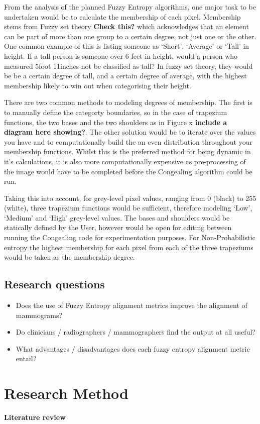 From the analysis of the planned Fuzzy Entropy algorithms, one major task to be undertaken would be to calculate the membership of each pixel. Membership stems from Fuzzy set theory \textbf{Check this?} which acknowledges that an element can be part of more than one group to a certain degree, not just one or the other. One common example of this is listing someone as `Short', `Average' or `Tall' in height. If a tall person is someone over 6 feet in height, would a person who measured 5foot 11inches not be classified as tall? In fuzzy set theory, they would be be a certain degree of tall, and a certain degree of average, with the highest membership likely to win out when categorising their height.

There are two common methods to modeling degrees of membership. The first is to manually define the categorty boundaries, so in the case of trapezium functions, the two bases and the two shoulders as in Figure x \textbf{include a diagram here showing?}. The other solution would be to iterate over the values you have and to computationally build the an even distribution throughout your membership functions. Whilst this is the preferred method for being dynamic in it's calculations, it is also more computationally expensive as pre-processing of the image would have to be completed before the Congealing algorithm could be run.

Taking this into account, for grey-level pixel values, ranging from 0 (black) to 255 (white), three trapezium functions would be sufficient, therefore modeling `Low', `Medium' and `High' grey-level values. The bases and shoulders would be statically defined by the User, however would be open for editing between running the Congealing code for experimentation purposes. For Non-Probabilistic entropy the highest membership for each pixel from each of the three trapeziums would be taken as the membership degree.

\subsection{Research questions}
\begin{itemize}
\item Does the use of Fuzzy Entropy alignment metrics improve the alignment of mammograms?
\item Do clinicians / radiographers / mammographers find the output at all useful?
\item What advantages / disadvantages does each fuzzy entropy alignment metric entail?
\end{itemize}

\section{Research Method}

\textbf{Literature review}

